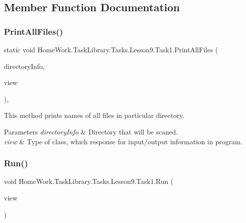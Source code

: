 \subsection{Member Function Documentation}
\mbox{\label{class_home_work_1_1_task_library_1_1_tasks_1_1_lesson9_1_1_task1_abc4526395f5d9e8c723479d0bb4b2783}} 
\subsubsection{\texorpdfstring{PrintAllFiles()}{PrintAllFiles()}}
{\footnotesize\ttfamily static void Home\+Work.\+Task\+Library.\+Tasks.\+Lesson9.\+Task1.\+Print\+All\+Files (\begin{DoxyParamCaption}\item[{Directory\+Info}]{directory\+Info,  }\item[{I\+Information}]{view }\end{DoxyParamCaption})\hspace{0.3cm}{\ttfamily [static]}, {\ttfamily [private]}}



This method prints names of all files in particular directory. 


\begin{DoxyParams}{Parameters}
{\em directory\+Info} & Directory that will be scaned.\\
\hline
{\em view} & Type of class, which response for input/output information in program.\\
\hline
\end{DoxyParams}
\mbox{\label{class_home_work_1_1_task_library_1_1_tasks_1_1_lesson9_1_1_task1_abf309774c050a656db5396e860d16ab2}} 
\subsubsection{\texorpdfstring{Run()}{Run()}}
{\footnotesize\ttfamily void Home\+Work.\+Task\+Library.\+Tasks.\+Lesson9.\+Task1.\+Run (\begin{DoxyParamCaption}\item[{I\+Information}]{view }\end{DoxyParamCaption})}



